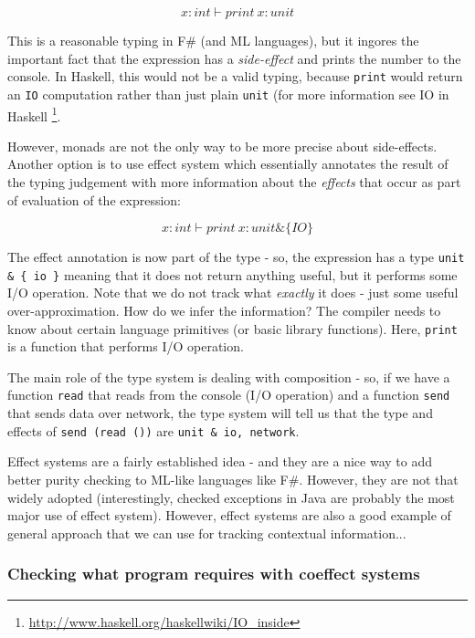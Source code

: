 \begin{equation}
x:int \vdash print~x : unit
\end{equation}

This is a reasonable typing in F\# (and ML languages), but it ingores the important fact that the 
expression has a \emph{side-effect} and prints the number to the console. In Haskell, this would not be
a valid typing, because \texttt{print} would return an \texttt{IO} computation rather than just plain \texttt{unit} (for
more information see IO in Haskell \footnote{\url{http://www.haskell.org/haskellwiki/IO_inside}}.

However, monads are not the only way to be more precise about side-effects. Another option is
to use effect system \cite{xx} which essentially annotates the 
result of the typing judgement with more information about the \emph{effects} that occur as part of
evaluation of the expression:

\begin{equation}
x:int \vdash print~x : unit \& \{ IO \}
\end{equation}

The effect annotation is now part of the type - so, the expression has a type \texttt{unit \& \{ io \}} meaning
that it does not return anything useful, but it performs some I/O operation. Note that we do not track
what \emph{exactly} it does - just some useful over-approximation. How do we infer the information?
The compiler needs to know about certain language primitives (or basic library functions). Here, 
\texttt{print} is a function that performs I/O operation.

The main role of the type system is dealing with composition - so, if we have a function \texttt{read} that
reads from the console (I/O operation) and a function \texttt{send} that sends data over network, the type
system will tell us that the type and effects of \texttt{send (read ())} are \texttt{unit \& {io, network}}.

Effect systems are a fairly established idea - and they are a nice way to add better purity checking
to ML-like languages like F\#. However, they are not that widely adopted (interestingly, checked
exceptions in Java are probably the most major use of effect system). However, effect systems are
also a good example of general approach that we can use for tracking contextual information...

\subsubsection{Checking what program requires with coeffect systems}

